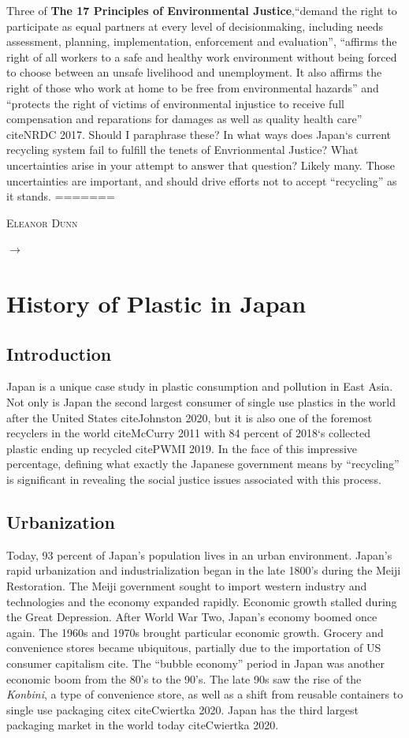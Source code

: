 \documentclass{book}\usepackage{knitr}
\makeatletter
\newcommand{\chapterauthor}[1]{%
  {\parindent0pt\vspace*{-25pt}%
  \linespread{1.1}\large\scshape#1%
  \par\nobreak\vspace*{35pt}}
  \@afterheading%
}
\makeatother
\begin{document}
Three of \textbf{The 17 Principles of Environmental Justice},``demand the right to
participate as equal partners at every level of decisionmaking, including needs assessment, planning, implementation, enforcement and evaluation'', ``affirms the right of all workers
to a safe and healthy work environment without being forced to choose between an unsafe livelihood and unemployment. It also affirms the right of those who work at home to be free from environmental hazards'' and ``protects the right of victims of environmental injustice to receive full compensation and reparations for damages as well as quality health care'' citeNRDC 2017. Should I paraphrase these? In what ways does Japan`s current recycling system fail to fulfill the tenets of Envrionmental Justice? What uncertainties arise in your attempt to answer that question? Likely many. Those uncertainties are important, and should drive efforts not to accept ``recycling'' as it stands.
=======

\chapterauthor{Eleanor Dunn}

$\rightarrow$

\section{History of Plastic in Japan}

\subsection{Introduction}

Japan is a unique case study in plastic consumption and pollution in East Asia. Not only is Japan the second largest consumer of single use plastics in the world after the United States citeJohnston 2020, but it is also one of the foremost recyclers in the world citeMcCurry 2011 with 84 percent of 2018`s collected plastic ending up recycled citePWMI 2019. In the face of this impressive percentage, defining what exactly the Japanese government means by ``recycling'' is significant in revealing the social justice issues associated with this process.

\subsection{Urbanization}

	Today, 93 percent of Japan's population lives in an urban environment. Japan's rapid urbanization and industrialization began in the late 1800's during the Meiji Restoration. The Meiji government sought to import western industry and technologies and the economy expanded rapidly. Economic growth stalled during the Great Depression. After World War Two, Japan's economy boomed once again. The 1960s and 1970s brought particular economic growth. Grocery and convenience stores became ubiquitous, partially due to the importation of US consumer capitalism cite. The ``bubble economy'' period in Japan was another economic boom from the 80's to the 90's. The late 90s saw the rise of the \emph{Konbini}, a type of convenience store, as well as a shift from reusable containers to single use packaging citex citeCwiertka 2020. Japan has the third largest packaging market in the world today citeCwiertka 2020. 
	
\end{document}
